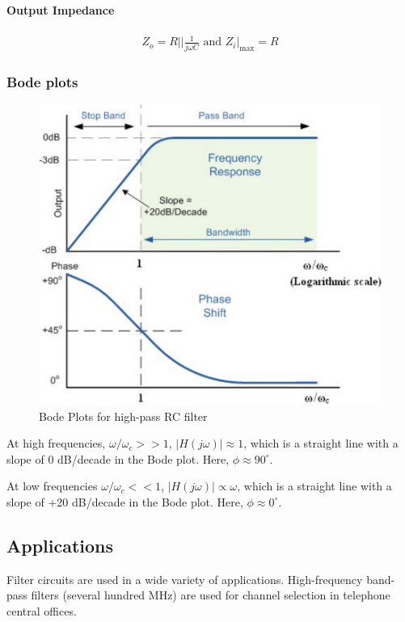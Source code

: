 \paragraph*{\textbf{Output Impedance}}
\begin{align*}
    Z_o = R\bigg|\bigg|\frac{1}{j\omega C} \text{ and } Z_i\big|_\text{max} = R
\end{align*}

\subsubsection*{\textbf{Bode plots}}

\begin{figure}[H]
    \centering
    \includegraphics[width=1\columnwidth]{images/f8.png}
    \caption{Bode Plots for high-pass RC filter}
    \label{fig:4}
\end{figure}

At high frequencies, $\omega/\omega_c>>1$, $|H(j\omega)| \approx 1$, which is a straight line with a slope of 0 dB/decade in the Bode plot. Here, $\phi \approx 90^{\circ}$.

At low frequencies $\omega/\omega_c<<1$, $|H(j\omega)| \propto \omega$, which is a straight line with a slope of +20 dB/decade in the Bode plot. Here, $\phi \approx 0^{\circ}$.

\subsection*{Applications}
Filter circuits are used in a wide variety of applications. High-frequency band-pass filters (several hundred MHz) are used for channel selection in telephone central offices. 

